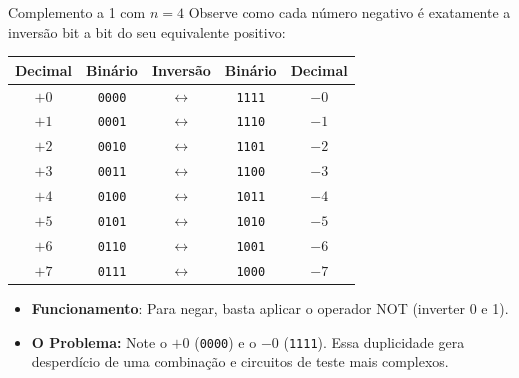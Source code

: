 \begin{frame}{Complemento a 1  com $n=4$}
    Observe como cada número negativo é exatamente a inversão bit a bit do seu equivalente positivo:

    \begin{center}
        \small
        \begin{tabular}{|c|c|c||c|c|}
            \hline
            \textbf{Decimal} & \textbf{Binário} & \textbf{Inversão}     & \textbf{Binário} & \textbf{Decimal} \\ \hline \hline
            $+0$             & \texttt{0000}    & $\longleftrightarrow$ & \texttt{1111}    & $-0$             \\ \hline
            $+1$             & \texttt{0001}    & $\longleftrightarrow$ & \texttt{1110}    & $-1$             \\ \hline
            $+2$             & \texttt{0010}    & $\longleftrightarrow$ & \texttt{1101}    & $-2$             \\ \hline
            $+3$             & \texttt{0011}    & $\longleftrightarrow$ & \texttt{1100}    & $-3$             \\ \hline
            $+4$             & \texttt{0100}    & $\longleftrightarrow$ & \texttt{1011}    & $-4$             \\ \hline
            $+5$             & \texttt{0101}    & $\longleftrightarrow$ & \texttt{1010}    & $-5$             \\ \hline
            $+6$             & \texttt{0110}    & $\longleftrightarrow$ & \texttt{1001}    & $-6$             \\ \hline
            $+7$             & \texttt{0111}    & $\longleftrightarrow$ & \texttt{1000}    & $-7$             \\ \hline
        \end{tabular}
    \end{center}

    \begin{itemize}
        \item \textbf{Funcionamento}: Para negar, basta aplicar o operador NOT (inverter 0 e 1).
        \item \textbf{O Problema:} Note o $+0$ (\texttt{0000}) e o $-0$ (\texttt{1111}). Essa duplicidade gera desperdício de uma combinação e circuitos de teste mais complexos.
    \end{itemize}
\end{frame}

